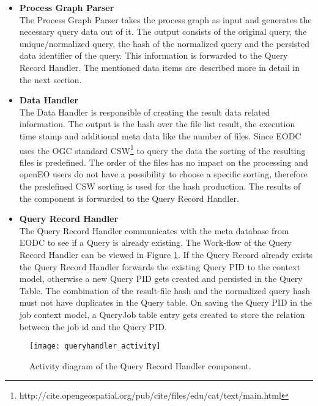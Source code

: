 \documentclass[draft,final]{vutinfth} %
\begin{document}
 \begin{itemize}
	\item \textbf{Process Graph Parser} \\
	The Process Graph Parser takes the process graph as input and generates the necessary query data out of it. The output consists of the original query, the unique/normalized query, the hash of the normalized query and the persisted data identifier of the query. This information is forwarded to the Query Record Handler. The mentioned data items are described more in detail in the next section.  
	\item \textbf{Data Handler} \\ 
	The Data Handler is responsible of creating the result data related information. The output is the hash over the file list result, the execution time stamp and additional meta data like the number of files. Since EODC uses the OGC standard CSW\footnote{http://cite.opengeospatial.org/pub/cite/files/edu/cat/text/main.html} to query the data the sorting of the resulting files is predefined. The order of the files has no impact on the processing and openEO users do not have a possibility to choose a specific sorting, therefore the predefined CSW sorting is used for the hash production. The results of the component is forwarded to the Query Record Handler.    
	\item \textbf{Query Record Handler} \\
	The Query Record Handler communicates with the meta database from EODC to see if a Query is already existing. The Work-flow of the Query Record Handler can be viewed in Figure \ref{fig:queryhandler_activity}. If the Query Record already exists the Query Record Handler forwards the existing Query PID to the context model, otherwise a new Query PID gets created and persisted in the Query Table. The combination of the result-file hash and the normalized query hash must not have duplicates in the Query table. On saving the Query PID in the job context model, a QueryJob table entry gets created to store the relation between the job id and the Query PID. 
	
\end{itemize}

\begin{figure}[h]
	\centering
	\texttt{[image: queryhandler\_activity]}
	\caption{Activity diagram of the Query Record Handler component.}
	\label{fig:queryhandler_activity} %
\end{figure}
\end{document}
